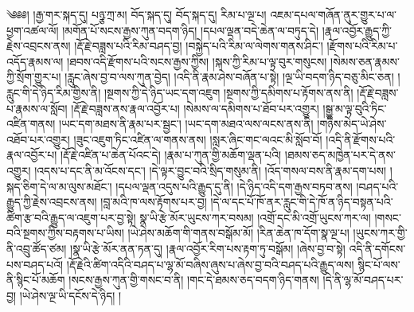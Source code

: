 ༄༅༅། །རྒྱ་གར་སྐད་དུ། པཉྩ་ཀྲ་མ། བོད་སྐད་དུ། བོད་སྐད་དུ། རིམ་པ་ལྔ་པ། འཇམ་དཔལ་གཞོན་ནུར་གྱུར་པ་ལ་ཕྱག་འཚལ་ལོ། །མགོན་པོ་སངས་རྒྱས་ཀུན་བདག་ཉིད། །དཔལ་ལྡན་བདེ་ཆེན་ལ་བཏུད་དེ། །རྣལ་འབྱོར་རྒྱུད་ཀྱི་རྗེས་འབྲངས་ནས། །རྡོ་རྗེ་བཟླས་པའི་རིམ་བཤད་བྱ། །བསྐྱེད་པའི་རིམ་ལ་ལེགས་གནས་ཤིང་། །རྫོགས་པའི་རིམ་པ་འདོད་རྣམས་ལ། །ཐབས་འདི་རྫོགས་པའི་སངས་རྒྱས་ཀྱིས། །སྐས་ཀྱི་རིམ་པ་ལྟ་བུར་གསུངས། །སེམས་ཅན་རྣམས་ཀྱི་སྲོག་གྱུར་པ། །རླུང་ཞེས་བྱ་བ་ལས་ཀུན་བྱེད། །འདི་ནི་རྣམ་ཤེས་བཞོན་པ་སྟེ། །ལྔ་ཡི་བདག་ཉིད་བཅུ་མིང་ཅན། །རླུང་གི་དེ་ཉིད་རིམ་གྱིས་ནི། །སྔགས་ཀྱི་དེ་ཉིད་ཡང་དག་འཇུག །སྔགས་ཀྱི་དམིགས་པ་རྟོགས་ནས་ནི། །རྡོ་རྗེ་བཟླས་པ་རྣམས་ལ་སློབ། །རྡོ་རྗེ་བཟླས་ནས་རྣལ་འབྱོར་པ། །སེམས་ལ་དམིགས་པ་ཐོབ་པར་འགྱུར། །སྒྱུ་མ་ལྟ་བུའི་ཏིང་འཛིན་གནས། །ཡང་དག་མཐས་ནི་རྣམ་པར་སྦྱང་། །ཡང་དག་མཐའ་ལས་ལངས་ནས་ནི། །གཉིས་མེད་ཡེ་ཤེས་འཐོབ་པར་འགྱུར། །ཟུང་འཇུག་ཏིང་འཛིན་ལ་གནས་ནས། །སླར་ཞིང་གང་ལའང་མི་སློབ་བོ། །འདི་ནི་རྫོགས་པའི་རྣལ་འབྱོར་པ། །རྡོ་རྗེ་འཛིན་པ་ཆེན་པོའང་དེ། །རྣམ་པ་ཀུན་གྱི་མཆོག་ལྡན་པའི། །ཐམས་ཅད་མཁྱེན་པར་དེ་ནས་འགྱུར། །འདས་པ་དང་ནི་མ་འོངས་དང་། །དེ་ལྟར་བྱུང་བའི་སྲིད་གསུམ་ནི། །འོད་གསལ་བས་ནི་རྣམ་དག་པས། །སྐད་ཅིག་དེ་ལ་མ་ལུས་མཐོང་། །དཔལ་ལྡན་འདུས་པའི་རྒྱུད་དུ་ནི། །དེ་ཉིད་འདི་དག་རྒྱས་བཏབ་ནས། །བཤད་པའི་རྒྱུད་ཀྱི་རྗེས་འབྲངས་ནས། །བླ་མའི་ཁ་ལས་རྟོགས་པར་བྱ། །དེ་ལ་དང་པོ་ཁོ་ནར་རླུང་གི་དེ་ཁོ་ན་ཉིད་བསྟན་པའི་ཚིག་རྩ་བའི་རྒྱུད་ལ་འཇུག་པར་བྱ་སྟེ། སྣ་ཡི་རྩེ་མོར་ཡུངས་ཀར་བསམ། །འགྲོ་དང་མི་འགྲོ་ཡུངས་ཀར་ལ། །གསང་བའི་སྔགས་ཀྱིས་བརྟགས་པ་ཡིས། །ཡེ་ཤེས་མཆོག་གི་གནས་བསྒོམ་མོ། །རིན་ཆེན་ཁ་དོག་སྣ་ལྔ་པ། །ཡུངས་ཀར་གྱི་ནི་འབྲུ་ཚོད་ཙམ། །སྣ་ཡི་རྩེ་མོར་ནན་ཏན་དུ། །རྣལ་འབྱོར་རིག་པས་རྟག་ཏུ་བསྒོམ། །ཞེས་བྱ་བ་སྟེ། འདི་ནི་དགོངས་པས་བཤད་པའོ། །རྡོ་རྗེའི་ཚིག་འདིའི་བཤད་པ་ལྷ་མོ་བཞིས་ཞུས་པ་ཞེས་བྱ་བའི་བཤད་པའི་རྒྱུད་ལས། སྙིང་པོ་ལས་ནི་སྙིང་པོ་མཆོག །སངས་རྒྱས་ཀུན་གྱི་གསང་བ་ནི། །གང་དེ་ཐམས་ཅད་བདག་ཉིད་གནས། །དེ་ནི་ལྷ་མོ་བཤད་པར་བྱ། །ཡེ་ཤེས་ལྔ་ཡི་དངོས་དེ་ཉིད། །
